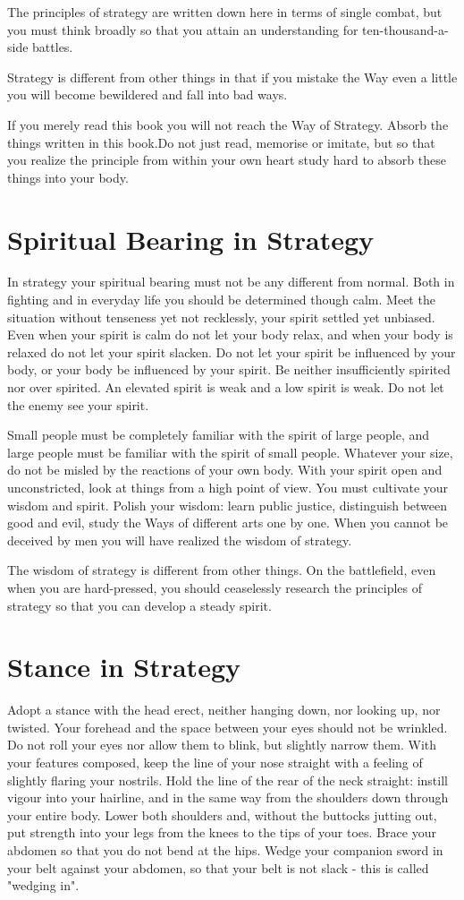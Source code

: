 \documentclass[12pt]{report}
\begin{document}
The principles of strategy are written down here in terms of single combat, but you must think broadly so that you attain an understanding for ten-thousand-a-side battles.

Strategy is different from other things in that if you mistake the Way even a little you will become bewildered and fall into bad ways.

If you merely read this book you will not reach the Way of Strategy. Absorb the things written in this book.Do not just read, memorise or imitate, but so that you realize the principle from within your own heart study hard to absorb these things into your body.
\section*{Spiritual Bearing in Strategy}
In strategy your spiritual bearing must not be any different from normal. Both in fighting and in everyday life you should be determined though calm. Meet the situation without tenseness yet not recklessly, your spirit settled yet unbiased. Even when your spirit is calm do not let your body relax, and when your body is relaxed do not let your spirit slacken. Do not let your spirit be influenced by your body, or your body be influenced by your spirit. Be neither insufficiently spirited nor over spirited. An elevated spirit is weak and a low spirit is weak. Do not let the enemy see your spirit.

Small people must be completely familiar with the spirit of large people, and large people must be familiar with the spirit of small people. Whatever your size, do not be misled by the reactions of your own body. With your spirit open and unconstricted, look at things from a high point of view. You must cultivate your wisdom and spirit. Polish your wisdom: learn public justice, distinguish between good and evil, study the Ways of different arts one by one. When you cannot be deceived by men you will have realized the wisdom of strategy.

The wisdom of strategy is different from other things. On the battlefield, even when you are hard-pressed, you should ceaselessly research the principles of strategy so that you can develop a steady spirit.
\clearpage
\section*{Stance in Strategy}
Adopt a stance with the head erect, neither hanging down, nor looking up, nor twisted. Your forehead and the space between your eyes should not be wrinkled. Do not roll your eyes nor allow them to blink, but slightly narrow them. With your features composed, keep the line of your nose straight with a feeling of slightly flaring your nostrils. Hold the line of the rear of the neck straight: instill vigour into your hairline, and in the same way from the shoulders down through your entire body. Lower both shoulders and, without the buttocks jutting out, put strength into your legs from the knees to the tips of your toes. Brace your abdomen so that you do not bend at the hips. Wedge your companion sword in your belt against your abdomen, so that your belt is not slack - this is called "wedging in".
\end{document}
